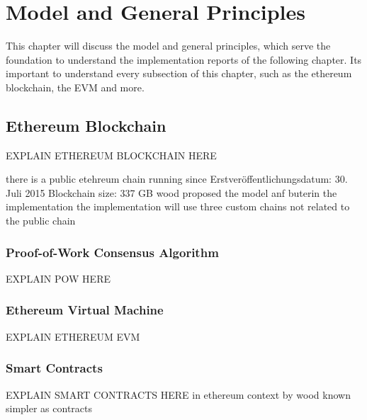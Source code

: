 \chapter{Model and General Principles}
\label{ch:background}

This chapter will discuss the model and general principles, which serve the foundation to understand the implementation reports of the following chapter. Its important to understand every subsection of this chapter, such as the ethereum blockchain, the \ac{EVM} and more. 

%
%
\section{Ethereum Blockchain}
\label{sec:background:first_section}
EXPLAIN ETHEREUM BLOCKCHAIN HERE

there is a public etehreum chain running since Erstveröffentlichungsdatum: 30. Juli 2015  Blockchain size: 337 GB
wood proposed the model anf buterin the implementation
the implementation will use three custom chains not related to the public chain 


\subsection{Proof-of-Work Consensus Algorithm}
\label{subsec:background:first_section:second_subsection}
EXPLAIN POW HERE
\cite{van2014encyclopedia}
\cite{nakamoto2008peer}
\cite{back2002hashcash}

\subsection{Ethereum Virtual Machine}
\label{subsec:background:first_section:ethereum}
EXPLAIN ETHEREUM \ac{EVM}

\cite{dannen2017introducing}	%
\cite{wood2014ethereum}

\subsection{Smart Contracts}
\label{subsec:background:first_section:first_subsection}
EXPLAIN SMART CONTRACTS HERE 
in ethereum context by wood known simpler as contracts
\cite{buterin2013ethereum}
\cite{wood2014ethereum}
\cite{dannen2017introducing}



